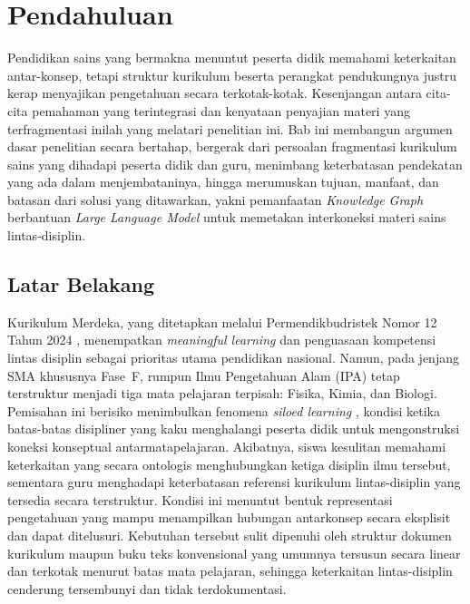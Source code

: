 \documentclass[../../thesis]{subfiles}
\begin{document}
\setcounter{chapter}{0}   %

\chapter{Pendahuluan}

Pendidikan sains yang bermakna menuntut peserta didik memahami keterkaitan
antar-konsep, tetapi struktur kurikulum beserta perangkat pendukungnya justru
kerap menyajikan pengetahuan secara terkotak-kotak. Kesenjangan antara cita-cita
pemahaman yang terintegrasi dan kenyataan penyajian materi yang terfragmentasi
inilah yang melatari penelitian ini. Bab ini membangun argumen dasar penelitian
secara bertahap, bergerak dari persoalan fragmentasi kurikulum sains yang
dihadapi peserta didik dan guru, menimbang keterbatasan pendekatan yang ada
dalam menjembataninya, hingga merumuskan tujuan, manfaat, dan batasan dari
solusi yang ditawarkan, yakni pemanfaatan \textit{Knowledge Graph} berbantuan
\textit{Large Language Model} untuk memetakan interkoneksi materi sains
lintas-disiplin.

\section{Latar Belakang}

Kurikulum Merdeka, yang ditetapkan melalui Permendikbudristek Nomor 12 Tahun
2024 \parencite{kemendikbudristek_permendikbudristek_2024}, menempatkan
\textit{meaningful learning} dan penguasaan kompetensi lintas
disiplin sebagai prioritas utama pendidikan nasional. Namun, pada jenjang SMA
khususnya Fase~F, rumpun Ilmu Pengetahuan Alam (IPA) tetap terstruktur menjadi
tiga mata pelajaran terpisah: Fisika, Kimia, dan Biologi.
Pemisahan ini berisiko menimbulkan fenomena \textit{siloed learning}
\parencite{harvey_silos_2025}, kondisi ketika batas-batas disipliner yang kaku
menghalangi peserta didik untuk mengonstruksi koneksi konseptual
antarmatapelajaran. Akibatnya, siswa kesulitan memahami keterkaitan yang secara
ontologis menghubungkan ketiga disiplin ilmu tersebut, sementara guru menghadapi
keterbatasan referensi kurikulum lintas-disiplin yang tersedia secara terstruktur.
Kondisi ini menuntut bentuk representasi pengetahuan yang mampu menampilkan
hubungan antarkonsep secara eksplisit dan dapat ditelusuri. Kebutuhan tersebut sulit
dipenuhi oleh struktur dokumen kurikulum maupun buku teks konvensional yang umumnya
tersusun secara linear dan terkotak menurut batas mata pelajaran, sehingga
keterkaitan lintas-disiplin cenderung tersembunyi dan tidak terdokumentasi.
\end{document}
